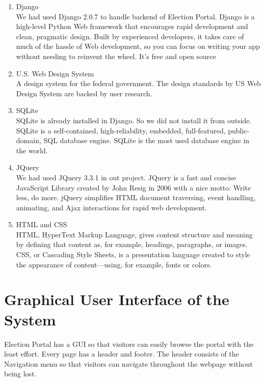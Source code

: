 \documentclass[12pt, a4paper, titlepage]{article}
\begin{document}
\begin{enumerate}
\item Django\\
We had used Django 2.0.7 to handle backend of Election Portal.
Django is a high-level Python Web framework that encourages rapid development and clean, pragmatic design. Built by experienced developers, it takes care of much of the hassle of Web development, so you can focus on writing your app without needing to reinvent the wheel. It’s free and open source

\item 
U.S. Web Design System\\
A design system for the federal government. The design standards by US Web Design System are backed by user research.

\item SQLite\\
SQLite is already installed in Django. So we did not install it from outside. SQLite is a self-contained, high-reliability, embedded, full-featured, public-domain, SQL database engine. SQLite is the most used database engine in the world.

\item JQuery\\
We had used JQuery 3.3.1 in out project. JQuery is a fast and concise JavaScript Library created by John Resig in 2006 with a nice motto: Write less, do more. jQuery simplifies HTML document traversing, event handling, animating, and Ajax interactions for rapid web development.

\item HTML and CSS\\
HTML, HyperText Markup Language, gives content structure and meaning by defining that content as, for example, headings, paragraphs, or images. CSS, or Cascading Style Sheets, is a presentation language created to style the appearance of content—using, for example, fonts or colors.
\end{enumerate}
\newpage

    
\section{Graphical User Interface of the System}
Election Portal has a GUI so that visitors can easily browse the portal with the least effort. Every page has a header and footer. The header consists of the Navigation menu so that visitors can navigate throughout the webpage without being lost.
\end{document}
